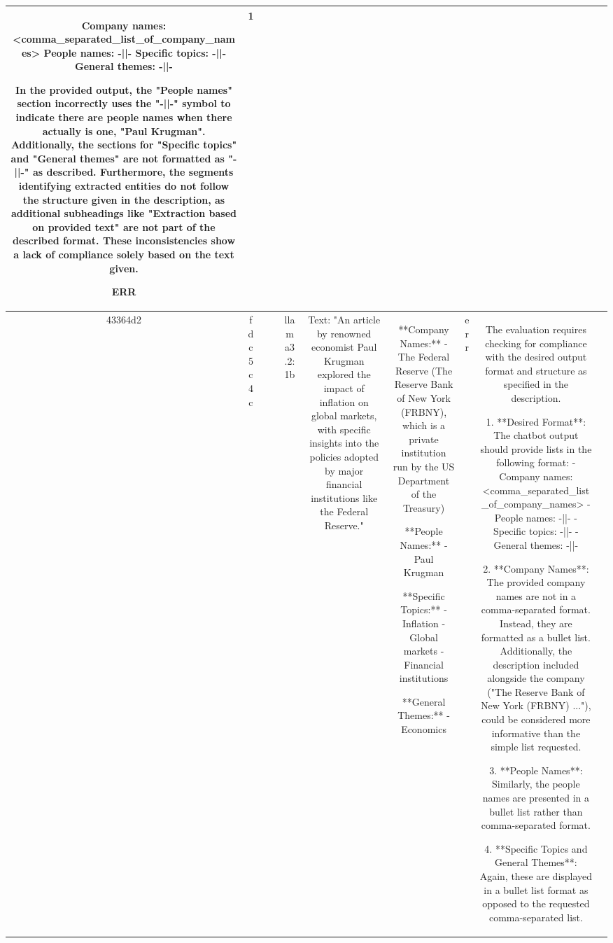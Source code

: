 \begin{table}[h!]
\begin{tabular}{|c|c|c|c|c|c|c|c|c|c|}
Company names: <comma_separated_list_of_company_names>  
People names: -||-  
Specific topics: -||-  
General themes: -||-

In the provided output, the "People names" section incorrectly uses the "-||-" symbol to indicate there are people names when there actually is one, "Paul Krugman". Additionally, the sections for "Specific topics" and "General themes" are not formatted as "-||-" as described. Furthermore, the segments identifying extracted entities do not follow the structure given in the description, as additional subheadings like "Extraction based on provided text" are not part of the described format. These inconsistencies show a lack of compliance solely based on the text given.

ERR & 1\\
\hline
43364d2 & fdc5c4c &  &  & llama3.2:1b & Text: "An article by renowned economist Paul Krugman explored the impact of inflation on global markets, with specific insights into the policies adopted by major financial institutions like the Federal Reserve." & **Company Names:** 
- The Federal Reserve (The Reserve Bank of New York (FRBNY), which is a private institution run by the US Department of the Treasury)

**People Names:**
- Paul Krugman

**Specific Topics:**
- Inflation
- Global markets
- Financial institutions

**General Themes:**
- Economics & err & The evaluation requires checking for compliance with the desired output format and structure as specified in the description.

1. **Desired Format**: The chatbot output should provide lists in the following format:
   - Company names: <comma_separated_list_of_company_names>
   - People names: -||-
   - Specific topics: -||-
   - General themes: -||-

2. **Company Names**: The provided company names are not in a comma-separated format. Instead, they are formatted as a bullet list. Additionally, the description included alongside the company ("The Reserve Bank of New York (FRBNY) ..."), could be considered more informative than the simple list requested.

3. **People Names**: Similarly, the people names are presented in a bullet list rather than comma-separated format.

4. **Specific Topics and General Themes**: Again, these are displayed in a bullet list format as opposed to the requested comma-separated list.


\end{tabular}
\end{table}
